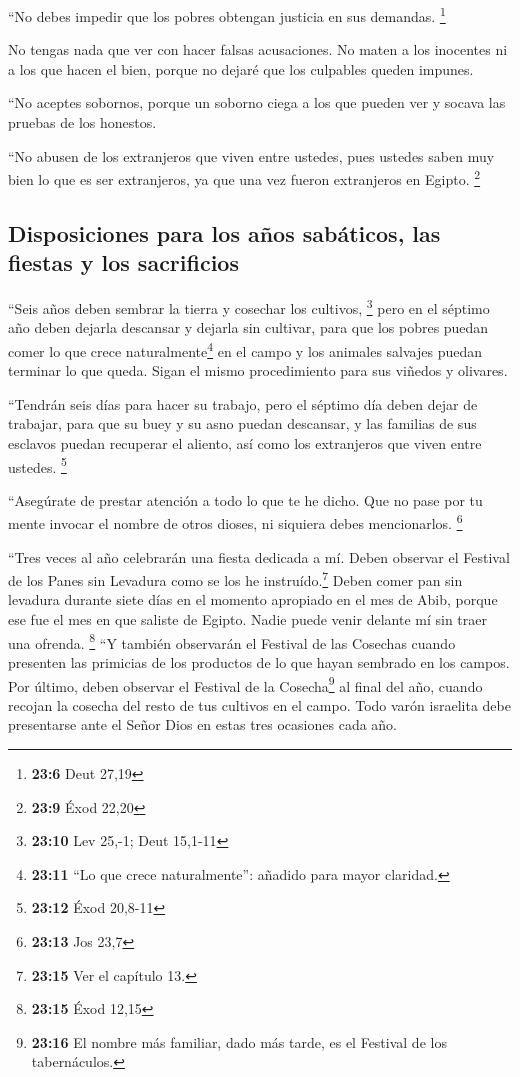  ``No debes impedir que los pobres obtengan justicia en
sus demandas. \footnote{\textbf{23:6} Deut 27,19}

 No tengas nada que ver con hacer falsas acusaciones. No
maten a los inocentes ni a los que hacen el bien, porque no dejaré que
los culpables queden impunes.

 ``No aceptes sobornos, porque un soborno ciega a los que
pueden ver y socava las pruebas de los honestos.

 ``No abusen de los extranjeros que viven entre ustedes,
pues ustedes saben muy bien lo que es ser extranjeros, ya que una vez
fueron extranjeros en Egipto. \footnote{\textbf{23:9} Éxod 22,20}

\hypertarget{disposiciones-para-los-auxf1os-sabuxe1ticos-las-fiestas-y-los-sacrificios}{%
\subsection{Disposiciones para los años sabáticos, las fiestas y los
sacrificios}\label{disposiciones-para-los-auxf1os-sabuxe1ticos-las-fiestas-y-los-sacrificios}}

 ``Seis años deben sembrar la tierra y cosechar los
cultivos, \footnote{\textbf{23:10} Lev 25,-1; Deut 15,1-11}
 pero en el séptimo año deben dejarla descansar y dejarla
sin cultivar, para que los pobres puedan comer lo que crece
naturalmente\footnote{\textbf{23:11} ``Lo que crece naturalmente'':
  añadido para mayor claridad.} en el campo y los animales salvajes
puedan terminar lo que queda. Sigan el mismo procedimiento para sus
viñedos y olivares.

 ``Tendrán seis días para hacer su trabajo, pero el
séptimo día deben dejar de trabajar, para que su buey y su asno puedan
descansar, y las familias de sus esclavos puedan recuperar el aliento,
así como los extranjeros que viven entre ustedes. \footnote{\textbf{23:12}
  Éxod 20,8-11}

 ``Asegúrate de prestar atención a todo lo que te he
dicho. Que no pase por tu mente invocar el nombre de otros dioses, ni
siquiera debes mencionarlos. \footnote{\textbf{23:13} Jos 23,7}

 ``Tres veces al año celebrarán una fiesta dedicada a mí.
 Deben observar el Festival de los Panes sin Levadura
como se los he instruído.\footnote{\textbf{23:15} Ver el capítulo 13.}
Deben comer pan sin levadura durante siete días en el momento apropiado
en el mes de Abib, porque ese fue el mes en que saliste de Egipto. Nadie
puede venir delante mí sin traer una ofrenda. \footnote{\textbf{23:15}
  Éxod 12,15}  ``Y también observarán el Festival de las
Cosechas cuando presenten las primicias de los productos de lo que hayan
sembrado en los campos. Por último, deben observar el Festival de la
Cosecha\footnote{\textbf{23:16} El nombre más familiar, dado más tarde,
  es el Festival de los tabernáculos.} al final del año, cuando recojan
la cosecha del resto de tus cultivos en el campo.  Todo
varón israelita debe presentarse ante el Señor Dios en estas tres
ocasiones cada año.

